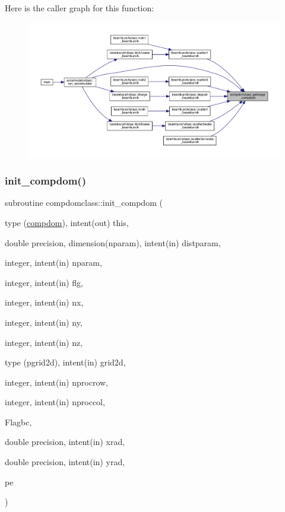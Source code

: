 Here is the caller graph for this function\+:\nopagebreak
\begin{figure}[H]
\begin{center}
\leavevmode
\includegraphics[width=350pt]{namespacecompdomclass_acba710aa1017492e05a537273742cc16_icgraph}
\end{center}
\end{figure}
\mbox{\label{namespacecompdomclass_acdfdc48f4091ad70b76c1c7ed66c10b0}} 
\subsubsection{\texorpdfstring{init\_compdom()}{init\_compdom()}}
{\footnotesize\ttfamily subroutine compdomclass\+::init\+\_\+compdom (\begin{DoxyParamCaption}\item[{type (\mbox{\hyperlink{namespacecompdomclass_structcompdomclass_1_1compdom}{compdom}}), intent(out)}]{this,  }\item[{double precision, dimension(nparam), intent(in)}]{distparam,  }\item[{integer, intent(in)}]{nparam,  }\item[{integer, intent(in)}]{flg,  }\item[{integer, intent(in)}]{nx,  }\item[{integer, intent(in)}]{ny,  }\item[{integer, intent(in)}]{nz,  }\item[{type (pgrid2d), intent(in)}]{grid2d,  }\item[{integer, intent(in)}]{nprocrow,  }\item[{integer, intent(in)}]{nproccol,  }\item[{}]{Flagbc,  }\item[{double precision, intent(in)}]{xrad,  }\item[{double precision, intent(in)}]{yrad,  }\item[{}]{pe }\end{DoxyParamCaption})}



